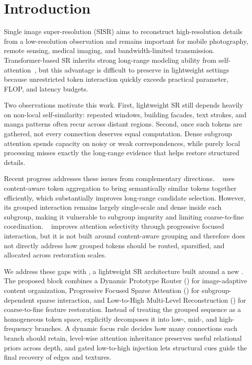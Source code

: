 \section{Introduction}

Single image super-resolution (SISR) aims to reconstruct high-resolution details from a low-resolution observation and remains important for mobile photography, remote sensing, medical imaging, and bandwidth-limited transmission. Transformer-based SR inherits strong long-range modeling ability from self-attention~\cite{vaswani2017attention}, but this advantage is difficult to preserve in lightweight settings because unrestricted token interaction quickly exceeds practical parameter, FLOP, and latency budgets.

Two observations motivate this work. First, lightweight SR still depends heavily on non-local self-similarity: repeated windows, building facades, text strokes, and manga patterns often recur across distant regions. Second, once such tokens are gathered, not every connection deserves equal computation. Dense subgroup attention spends capacity on noisy or weak correspondences, while purely local processing misses exactly the long-range evidence that helps restore structured details.

Recent progress addresses these issues from complementary directions. \baseline{}~\cite{liu2025catanet} uses content-aware token aggregation to bring semantically similar tokens together efficiently, which substantially improves long-range candidate selection. However, its grouped interaction remains largely single-scale and dense inside each subgroup, making it vulnerable to subgroup impurity and limiting coarse-to-fine coordination. \pft{}~\cite{long2025pft} improves attention selectivity through progressive focused interaction, but it is not built around content-aware grouping and therefore does not directly address how grouped tokens should be routed, sparsified, and allocated across restoration scales.

We address these gaps with \method{}, a lightweight SR architecture built around a new \moduleName{}. The proposed block combines a Dynamic Prototype Router (\dpr{}) for image-adaptive content organization, Progressive Focused Sparse Attention (\pfsa{}) for subgroup-dependent sparse interaction, and Low-to-High Multi-Level Reconstruction (\lmr{}) for coarse-to-fine feature restoration. Instead of treating the grouped sequence as a homogeneous token space, \method{} explicitly decomposes it into low-, mid-, and high-frequency branches. A dynamic focus rule decides how many connections each branch should retain, level-wise attention inheritance preserves useful relational priors across depth, and gated low-to-high injection lets structural cues guide the final recovery of edges and textures.

